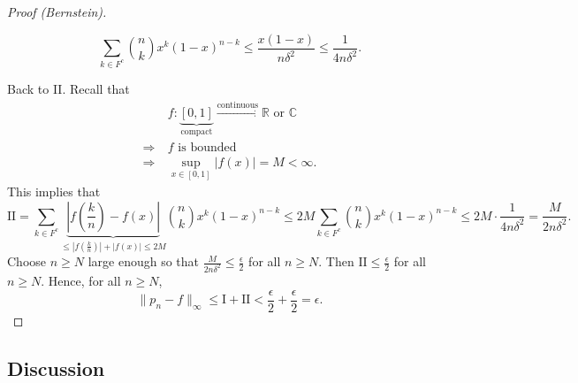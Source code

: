 \documentclass[letterpaper, reqno,11pt]{article}
\newcommand{\RR}{\mathbb{R}}
\newcommand{\CC}{\mathbb{C}}
\begin{document}
\begin{proof}[Proof (Bernstein)]
  \begin{figure}[H]
    \centering
  \end{figure}

  \begin{equation} \label{eq:star} \tag{*}
    \sum_{k \in F^c} \binom{n}{k} x^k (1 - x)^{n - k} \leq \frac{x(1 - x)}{n \delta^2} \leq \frac{1}{4n \delta^2}.
  \end{equation}

  Back to II. Recall that
  \begin{align*}
    & f : \underbrace{[0, 1]}_\text{compact} \xrightarrow{\text{continuous}} \RR \text{ or } \CC \\
    \Rightarrow ~ & f \text{ is bounded} \\
    \Rightarrow ~ & \sup_{x \in [0, 1]} |f(x)| = M < \infty.
  \end{align*}
  This implies that
  $$ \text{II} = \sum_{k \in F^c} \underbrace{\left|f\left(\frac{k}{n}\right) - f(x)\right|}_{\leq \left|f\left(\frac{k}{n}\right)\right| + |f(x)| \leq 2M} \binom{n}{k} x^k (1 - x)^{n - k} \leq 2M \sum_{k \in F^c} \binom{n}{k} x^k (1 - x)^{n - k} \leq 2M \cdot \frac{1}{4n\delta^2} = \frac{M}{2n\delta^2}. $$
  Choose $n \geq N$ large enough so that $\frac{M}{2n\delta^2} \leq \frac{\epsilon}{2}$ for all $n \geq N$. Then $\text{II} \leq \frac{\epsilon}{2}$ for all $n \geq N$. Hence, for all $n \geq N$,
  $$ \lVert p_n - f \rVert_\infty \leq \text{I} + \text{II} < \frac{\epsilon}{2} + \frac{\epsilon}{2} = \epsilon. $$
\end{proof}

\subsection{Discussion}
\end{document}
